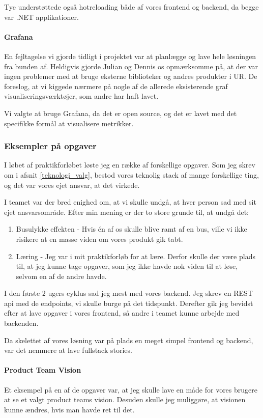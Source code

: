 \documentclass[a4paper]{article}
\begin{document}
Tye understøttede også hotreloading både af vores frontend og backend,
da begge var .NET applikationer.

\paragraph{Grafana}
En fejltagelse vi gjorde tidligt i projektet var at planlægge og lave hele løsningen fra bunden af.
Heldigvis gjorde Julian og Dennis os opmærksomme på,
at der var ingen problemer med at bruge eksterne biblioteker og andres produkter i UR.
De foreslog, at vi kiggede nærmere på nogle af de allerede eksisterende graf visualiseringsværktøjer,
som andre har haft lavet.

Vi valgte at bruge Grafana, da det er open source, og det er lavet med det specifikke formål at visualisere metrikker.

\subsubsection{Eksempler på opgaver}
I løbet af praktikforløbet løste jeg en række af forskellige opgaver.
Som jeg skrev om i afsnit \ref{teknologi_valg},
bestod vores teknolig stack af mange forskellige ting, og det var vores ejet ansvar,
at det virkede.

I teamet var der bred enighed om, at vi skulle undgå, 
at hver person sad med sit ejet ansvarsområde.
Efter min mening er der to store grunde til,
at undgå det:

\begin{enumerate}
    \item Busulykke effekten - Hvis én af os skulle blive ramt af en bus,
     ville vi ikke risikere at en masse viden om vores produkt gik tabt.
    \item Læring - Jeg var i mit praktikforløb for at lære.
    Derfor skulle der være plads til,
    at jeg kunne tage opgaver,
    som jeg ikke havde nok viden til at løse, selvom en af de andre havde.
\end{enumerate}

I den første 2 ugers cyklus sad jeg mest med vores backend.
Jeg skrev en REST api med de endpoints, vi skulle burge på det tidspunkt.
Derefter gik jeg bevidst efter at lave opgaver i vores frontend,
så andre i teamet kunne arbejde med backenden.

Da skelettet af vores løsning var på plads
en meget simpel frontend og backend, var det nemmere at lave fullstack stories.

\paragraph{Product Team Vision}
Et eksempel på en af de opgaver var,
at jeg skulle lave en måde for vores brugere at se et valgt product teams vision.
Desuden skulle jeg muliggøre, at visionen kunne ændres,
hvis man havde ret til det.
\end{document}
